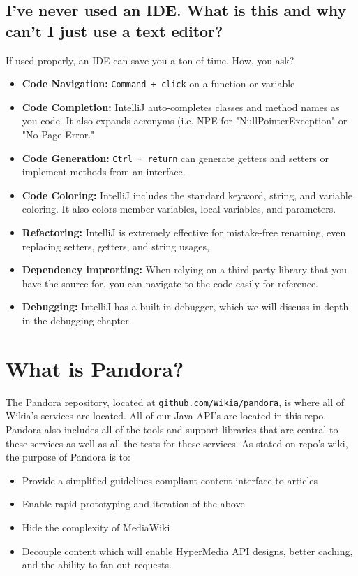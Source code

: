 \documentclass[oneside]{book}
\begin{document}
\subsection{I've never used an IDE. What is this and why can't I just use a text editor?}
If used properly, an IDE can save you a ton of time. 
How, you ask?
\begin{itemize}
	\item \textbf{Code Navigation:} \texttt{Command + click} on a function or variable
	\item \textbf{Code Completion:} IntelliJ auto-completes classes and method names as you code. It also expands acronyms (i.e. NPE for "NullPointerException" or "No Page Error."
	\item \textbf{Code Generation:} \texttt{Ctrl + return} can generate getters and setters or implement methods from an interface.
	\item \textbf{Code Coloring:} IntelliJ includes the standard keyword, string, and variable coloring. It also colors member variables, local variables, and parameters.
	\item \textbf{Refactoring:} IntelliJ is extremely effective for mistake-free renaming, even replacing setters, getters, and string usages,
	\item \textbf{Dependency improrting:} When relying on a third party library that you have the source for, you can navigate to the code easily for reference.
	\item \textbf{Debugging:} IntelliJ has a built-in debugger, which we will discuss in-depth in the debugging chapter.
\end{itemize}
\section{What is Pandora?}
The Pandora repository, located at \texttt{github.com/Wikia/pandora}, is where all of Wikia's services are located. All of our Java API's are located in this repo. Pandora also includes all of the tools and support libraries that are central to these services as well as all the tests for these services. As stated on repo's wiki, the purpose of Pandora is to:
\begin{itemize}
	\item Provide a simplified guidelines compliant content interface to articles
	\item Enable rapid prototyping and iteration of the above
	\item Hide the complexity of MediaWiki
	\item Decouple content which will enable HyperMedia API designs, better caching, and the ability to fan-out requests.
\end{itemize}
\end{document}

